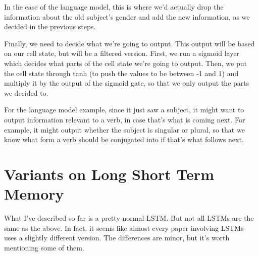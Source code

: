 \documentclass[12pt]{article} %
\begin{document}
In the case of the language model, this is where we'd actually drop the information about the old subject's gender and add the new information, as we decided in the previous steps.

\begin{figure}[H] %
\label{fig:rnnunrolled}
\end{figure}

Finally, we need to decide what we're going to output. This output will be based on our cell state, but will be a filtered version. First, we run a sigmoid layer which decides what parts of the cell state we're going to output. Then, we put the cell state through tanh (to push the values to be between -1 and 1) and multiply it by the output of the sigmoid gate, so that we only output the parts we decided to.

For the language model example, since it just saw a subject, it might want to output information relevant to a verb, in case that's what is coming next. For example, it might output whether the subject is singular or plural, so that we know what form a verb should be conjugated into if that's what follows next.

\begin{figure}[H] %
\label{fig:rnnunrolled}
\end{figure}

\section{Variants on Long Short Term Memory}

What I've described so far is a pretty normal LSTM. But not all LSTMs are the same as the above. In fact, it seems like almost every paper involving LSTMs uses a slightly different version. The differences are minor, but it's worth mentioning some of them.
\end{document}
